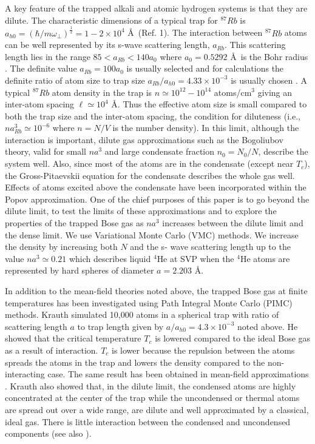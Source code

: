 \documentclass[aps,pra,twocolumn,groupedaddress]{revtex4}
\begin{document}
A key feature of the trapped alkali and atomic hydrogen systems is that they are
dilute. The characteristic dimensions of a typical trap for $^{87}Rb$ is
$a_{h0}=\left( {\hbar}/{m\omega_\perp}\right)^\frac{1}{2}=1-2 \times 10^4$
\AA\ (Ref. 1). The interaction between $^{87}Rb$ atoms can be well represented
by its s-wave scattering length, $a_{Rb}$. This scattering length lies in the
range $85 < a_{Rb} < 140 a_0$ where $a_0 = 0.5292$ \AA\ is the Bohr radius
\cite{gardner95}. The definite value $a_{Rb} = 100 a_0$ is usually selected and
for calculations the definite ratio of atom size to trap size 
$a_{Rb}/a_{h0} = 4.33 \times 10^{-3}$ 
is usually chosen \cite{dalfovo99}. A typical $^{87}Rb$ atom
density in the trap is $n \simeq 10^{12}- 10^{14}$ atoms/cm$^3$ giving an
inter-atom spacing $\ell \simeq 10^4$ \AA. Thus the effective atom size is small
compared to both the trap size and the inter-atom spacing, the condition
for diluteness (i.e., $na^3_{Rb} \simeq 10^{-6}$ where $n = N/V$ is the number
density). In this limit,
although the interaction is important, dilute gas approximations such as the
Bogoliubov theory\cite{bogoliubov47}, valid for small $na^3$ and large
condensate fraction $n_0 = N_0/N$, describe the system well. Also, since most
of the atoms are in the condensate (except near $T_c$), the Gross-Pitaevskii
equation\cite{gross61,pitaevskii61} for the condensate describes the whole gas
well. Effects of atoms excited above the condensate have been incorporated
within the Popov approximation\cite{hutchinson97}. One of the chief purposes of
this paper is to go beyond the dilute limit, to test the limits of these
approximations and to explore the properties of the trapped Bose gas as $na^3$
increases between the dilute limit and the dense limit.  We  use Variational Monte
Carlo (VMC) methods. We increase the density by increasing both $N$ and the s-
wave scattering length up to the value $na^3 \simeq 0.21$ which 
describes liquid $^4$He at SVP when the $^4$He atoms are represented by hard
spheres of diameter $a = 2.203$ \AA\cite{kalos74}.

In addition to the mean-field theories noted above, the trapped Bose gas at
finite temperatures has been investigated using Path Integral Monte Carlo (PIMC)
methods. Krauth\cite{krauth96} simulated 10,000 atoms in a spherical trap with
ratio of scattering length $a$ to trap length given by 
$a/a_{h0}=4.3\times10^{-3}$ noted
above. He showed that the critical temperature $T_c$ is lowered compared to the
ideal Bose gas as a result of interaction. $T_c$ is lower because the repulsion
between the atoms spreads the atoms in the trap and lowers the density compared
to the non- interacting case. The same result has been obtained in mean-field
approximations \cite{dalfovo99}. Krauth also showed that, in the dilute limit,
the condensed atoms are highly concentrated at the center of the trap while the
uncondensed or thermal atoms are spread out over a wide range, are dilute and
well approximated by a classical, ideal gas. There is little interaction between
the condensed and uncondensed components (see also \cite{dalfovo99}).
\end{document}
